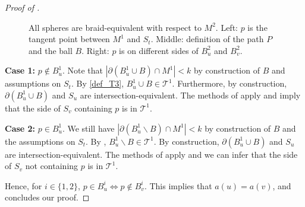 \documentclass{article}
\newcommand{\T}{\mathcal{T}}
\newcommand{\control}[2]{ ($#2+#1$) .. #1}
\begin{document}
\begin{proof}[Proof of ]
\begin{figure}[ht]
\begin{center}
\caption{All spheres are braid-equivalent with respect to $M^2$. Left: $p$ is the tangent point between $M^1$ and $S_t$. Middle: definition of the path $P$ and the ball $B$. Right: $p$ is on different sides of $B^2_u$ and $B^2_v$.}
\label{pic_lem_16_ex}
\end{center}
\end{figure}

\noindent
{\bf Case 1:} $p \not\in B^1_u$. Note that $|\partial(B^1_u \cup B) \cap M^1 | < k$ by construction of $B$ and assumptions on $S_t$. By \ref{def_T3}, $B^1_u \cup B \in \T^1$. Furthermore, by construction, $\partial (B^1_u \cup B)$ and $S_u$ are intersection-equivalent. The methods of  apply and imply that the side of $S_v$ containing $p$ is in $\T^1$.

\noindent
{\bf Case 2:} $p \in B^1_u$. We still have $|\partial(B^1_u \smallsetminus B) \cap M^1 | < k$ by construction of $B$ and the assumptions on $S_t$. By , $B^1_u \smallsetminus B \in \T^1$. By construction, $\partial (B^1_u \cup B)$ and $S_u$ are intersection-equivalent. The methods of  apply and we can infer that the side of $S_v$ not containing $p$ is in $\T^1$.

Hence, for $i \in \{1,2\}$, $p \in B^i_u \Leftrightarrow p \not \in B^i_v$. This implies that $a(u) = a(v)$, and concludes our proof. 
\end{proof}
\end{document}
